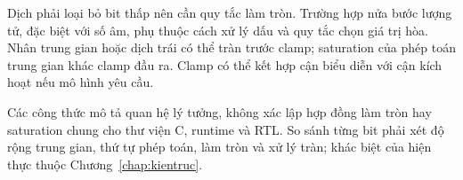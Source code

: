 Dịch phải loại bỏ bit thấp nên cần quy tắc làm tròn. Trường hợp nửa bước lượng tử, đặc biệt với số âm, phụ thuộc cách xử lý dấu và quy tắc chọn giá trị hòa. Nhân trung gian hoặc dịch trái có thể tràn trước clamp; saturation của phép toán trung gian khác clamp đầu ra. Clamp có thể kết hợp cận biểu diễn với cận kích hoạt nếu mô hình yêu cầu.

Các công thức mô tả quan hệ lý tưởng, không xác lập hợp đồng làm tròn hay saturation chung cho thư viện C, runtime và RTL. So sánh từng bit phải xét độ rộng trung gian, thứ tự phép toán, làm tròn và xử lý tràn; khác biệt của hiện thực thuộc Chương~\ref{chap:kientruc}.

